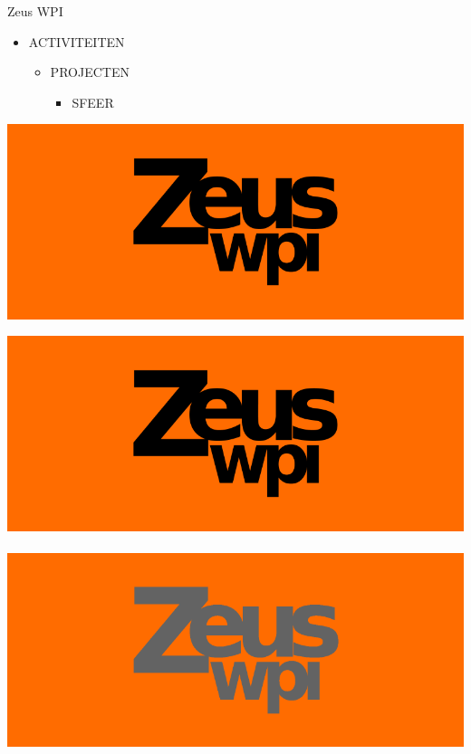 \documentclass{beamer}
\begin{document}
\begin{frame}[plain, c]
    \begin{center}
        \Huge Zeus WPI
    \end{center}
\end{frame}
\begin{frame}[plain, c]
    \begin{itemize}
        \item ACTIVITEITEN
            \begin{itemize}
                \item PROJECTEN
                    \begin{itemize}
                        \item SFEER
                    \end{itemize}
            \end{itemize}
    \end{itemize}
\end{frame}
\begin{frame}[plain, c]
    \includegraphics[width=\linewidth]{image1.png}
\end{frame}
\begin{frame}[plain, c]
    \includegraphics[width=.5\linewidth]{image2.png}
    ~
    \includegraphics[width=.5\linewidth]{image3.png}
\end{frame}
\end{document}
